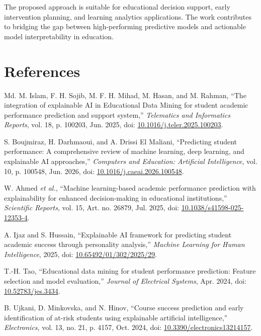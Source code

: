 \documentclass[12pt,a4paper]{article}
\begin{document}
The proposed approach is suitable for educational decision support, early intervention planning, and learning analytics applications. The work contributes to bridging the gap between high-performing predictive models and actionable model interpretability in education.

\section*{References}
\begin{enumerate}[label={[\arabic*]}, leftmargin=1.5em]
	\item Md. M. Islam, F. H. Sojib, M. F. H. Mihad, M. Hasan, and M. Rahman, ``The integration of explainable AI in Educational Data Mining for student academic performance prediction and support system,'' \textit{Telematics and Informatics Reports}, vol. 18, p. 100203, Jun. 2025, doi: \href{https://doi.org/10.1016/j.teler.2025.100203}{10.1016/j.teler.2025.100203}.

	\item S. Boujmiraz, H. Darhmaoui, and A. Drissi El Maliani, ``Predicting student performance: A comprehensive review of machine learning, deep learning, and explainable AI approaches,'' \textit{Computers and Education: Artificial Intelligence}, vol. 10, p. 100548, Jun. 2026, doi: \href{https://doi.org/10.1016/j.caeai.2026.100548}{10.1016/j.caeai.2026.100548}.

	\item W. Ahmed \textit{et al.}, ``Machine learning-based academic performance prediction with explainability for enhanced decision-making in educational institutions,'' \textit{Scientific Reports}, vol. 15, Art. no. 26879, Jul. 2025, doi: \href{https://doi.org/10.1038/s41598-025-12353-4}{10.1038/s41598-025-12353-4}.

	\item A. Ijaz and S. Hussain, ``Explainable AI framework for predicting student academic success through personality analysis,'' \textit{Machine Learning for Human Intelligence}, 2025, doi: \href{https://doi.org/10.65492/01/302/2025/29}{10.65492/01/302/2025/29}.

	\item T.-H. Tao, ``Educational data mining for student performance prediction: Feature selection and model evaluation,'' \textit{Journal of Electrical Systems}, Apr. 2024, doi: \href{https://doi.org/10.52783/jes.3434}{10.52783/jes.3434}.

	\item B. Ujkani, D. Minkovska, and N. Hinov, ``Course success prediction and early identification of at-risk students using explainable artificial intelligence,'' \textit{Electronics}, vol. 13, no. 21, p. 4157, Oct. 2024, doi: \href{https://doi.org/10.3390/electronics13214157}{10.3390/electronics13214157}.


\end{enumerate}
\end{document}
